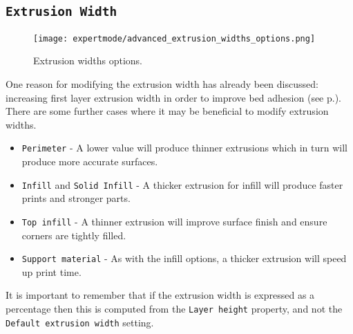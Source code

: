 
\subsection{\texttt{Extrusion Width}} %
\label{sec:extrusion_width}

\begin{figure}[H]
\centering
\texttt{[image: expertmode/advanced\_extrusion\_widths\_options.png]}
\caption{Extrusion widths options.}
\label{fig:advanced_extrusion_widths_options}
\end{figure}

One reason for modifying the extrusion width has already been discussed: increasing first layer extrusion width in order to improve bed adhesion (see p.\pageref{par:wider_extrusion_width}).  There are some further cases where it may be beneficial to modify extrusion widths.
\begin{itemize}
    \item \texttt{Perimeter} - A lower value will produce thinner extrusions which in turn will produce more accurate surfaces.
    \item \texttt{Infill} and \texttt{Solid Infill} - A thicker extrusion for infill will produce faster prints and stronger parts.
    \item \texttt{Top infill} - A thinner extrusion will improve surface finish and ensure corners are tightly filled.
    \item \texttt{Support material} - As with the infill options, a thicker extrusion will speed up print time.
\end{itemize}

It is important to remember that if the extrusion width is expressed as a percentage then this is computed from the \texttt{Layer height} property, and not the \texttt{Default extrusion width} setting.

